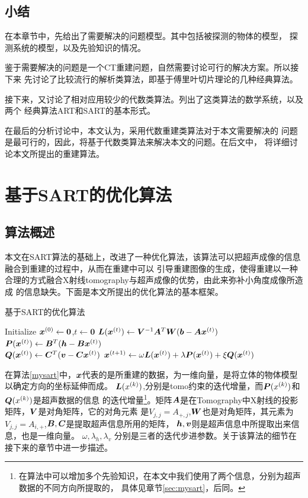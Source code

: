 \section{小结}
在本章节中，先给出了需要解决的问题模型。其中包括被探测的物体的模型，
探测系统的模型，以及先验知识的情况。

鉴于需要解决的问题是一个CT重建问题，自然需要讨论可行的解决方案。所以接下来
先讨论了比较流行的解析类算法，即基于傅里叶切片理论的几种经典算法。

接下来，又讨论了相对应用较少的代数类算法。列出了这类算法的数学系统，以及两个
经典算法ART和SART的基本形式。

在最后的分析讨论中，本文认为，采用代数重建类算法对于本文需要解决的
问题是最可行的，因此，将基于代数类算法来解决本文的问题。在后文中，
将详细讨论本文所提出的重建算法。


\chapter{基于SART的优化算法}
\section{算法概述}
本文在SART算法的基础上，改进了一种优化算法，该算法可以把超声成像的信息融合到重建的过程中，从而在重建中可以
引导重建图像的生成，使得重建以一种合理的方式融合X射线tomography与超声成像的优势，由此来弥补小角度成像所造成
的信息缺失。下面是本文所提出的优化算法的基本框架。
\begin{algo}\label{mysart}
基于SART的优化算法
\begin{algorithmic}[1]
\STATE
Initialize $\bm{ x}^{(0)} \leftarrow \bm{0}$,$t\leftarrow \bm{0}$
\REPEAT
\STATE
$\bm{L}(\bm{ x}^{(t)}) \leftarrow  \bm{V}^{-1}\bm{A}^T\bm{W}(\bm{b}-\bm{A}\bm{ x}^{(t)})$ \\
$\bm{P}(\bm{ x}^{(t)}) \leftarrow \bm{B}^{T}(\bm{h}-\bm{B}\bm{ x}^{(t)})$ \\    %
$\bm{Q}(\bm{ x}^{(t)}) \leftarrow \bm{C}^{T}(\bm{v}-\bm{C}\bm{ x}^{(t)})$         %
\STATE
$\bm{ x}^{(t+1)}\leftarrow \omega\bm{L}(\bm{ x}^{(t)}) + \lambda\bm{P}(\bm{ x}^{(t)}) + \xi\bm{Q}(\bm{ x}^{(t)})    $
\end{algorithmic}
\end{algo}

在算法\ref{mysart}中，$\bm{ x}$代表的是所重建的数据，为一维向量，是将立体的物体模型以确定方向的坐标延伸而成。
$\bm{L}(x^{(k)})$,分别是tomo约束的迭代增量，而$\bm{P}(x^{(k)})$和$ \bm{Q}(x^{(k)})$是超声数据的信息
的迭代增量\footnote{在算法中可以增加多个先验知识，在本文中我们使用了两个信息，分别为超声数据的不同方向所提取的，
具体见章节\ref{sec:mysart}，后同。}。矩阵$\bm{A}$是在Tomography中X射线的投影矩阵，$\bm{V}$是对角矩阵，它的对角元素
是$V_{j,j}=A_{+,j}$,$\bm{W}$也是对角矩阵，其元素为$V_{j,j}=A_{i,+}$,$\bm{B},\bm{C}$是提取超声信息所用的矩阵，
$\bm{h},\bm{v}$则是超声信息中所提取出来信息，也是一维向量。
$\omega,\lambda_h,\lambda_v$
分别是三者的迭代步进参数。关于该算法的细节在接下来的章节中进一步描述。


